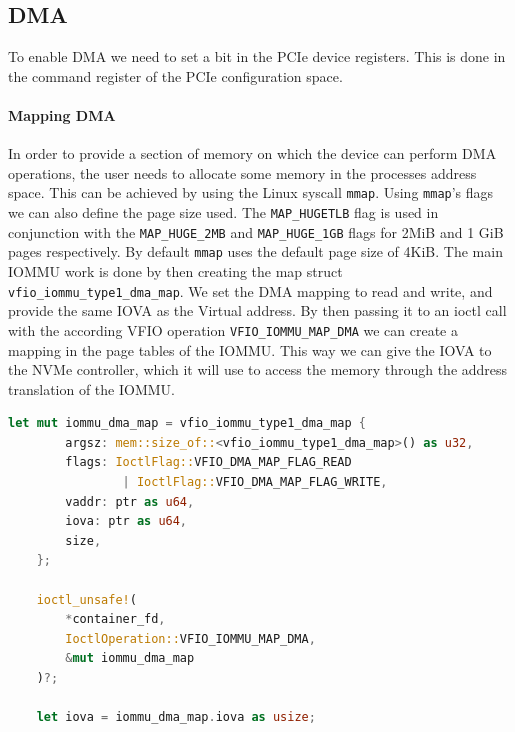 \subsection{DMA}
To enable DMA we need to set a bit in the PCIe device registers. %
This is done in the command register of the PCIe configuration space.

\paragraph{Mapping DMA}
In order to provide a section of memory on which the device can perform DMA operations, the user needs to allocate some memory in the processes address space. This can be achieved by using the Linux syscall \texttt{mmap}. Using \texttt{mmap}'s flags we can also define the page size used. The \texttt{MAP\_HUGETLB} flag is used in conjunction with the \texttt{MAP\_HUGE\_2MB} and \texttt{MAP\_HUGE\_1GB} flags for 2MiB and 1 GiB pages respectively. By default \texttt{mmap} uses the default page size of 4KiB.
The main IOMMU work is done by then creating the map struct \texttt{vfio\_iommu\_type1\_dma\_map}. We set the DMA mapping to read and write, and provide the same IOVA as the Virtual address. By then passing it to an ioctl call with the according VFIO operation \texttt{VFIO\_IOMMU\_MAP\_DMA} we can create a mapping in the page tables of the IOMMU. This way we can give the IOVA to the NVMe controller, which it will use to access the memory through the address translation of the IOMMU.

\begin{lstlisting}[language=Rust,caption={Mapping memory for DMA}, label=lst:mapdma]
    let mut iommu_dma_map = vfio_iommu_type1_dma_map {
        argsz: mem::size_of::<vfio_iommu_type1_dma_map>() as u32,
        flags: IoctlFlag::VFIO_DMA_MAP_FLAG_READ 
                | IoctlFlag::VFIO_DMA_MAP_FLAG_WRITE,
        vaddr: ptr as u64,
        iova: ptr as u64,
        size,
    };

    ioctl_unsafe!(
        *container_fd,
        IoctlOperation::VFIO_IOMMU_MAP_DMA,
        &mut iommu_dma_map
    )?;

    let iova = iommu_dma_map.iova as usize; 
\end{lstlisting}

\newpage

